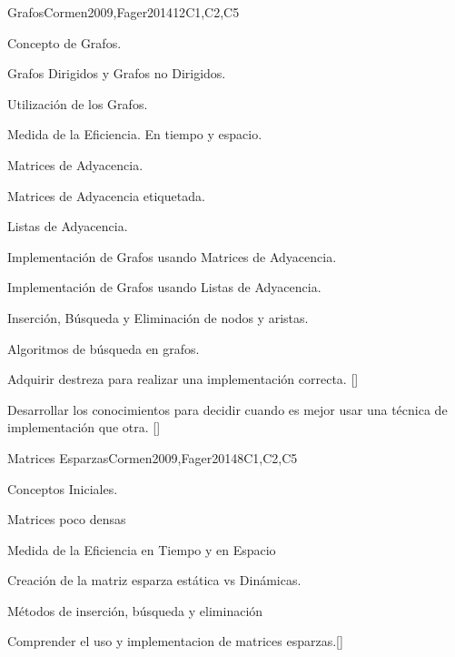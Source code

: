 \begin{syllabus}
\begin{unit}{}{Grafos}{Cormen2009,Fager2014}{12}{C1,C2,C5}
   \begin{topics}
    \item Concepto de Grafos.
    \item Grafos Dirigidos y Grafos no Dirigidos.
    \item Utilización de los Grafos.
    \item Medida de la Eficiencia. En tiempo y espacio.
    \item Matrices de Adyacencia.
    \item Matrices de Adyacencia etiquetada.
    \item Listas de Adyacencia.
    \item Implementación de Grafos usando Matrices de Adyacencia.
    \item Implementación de Grafos usando Listas de Adyacencia.
    \item Inserción, Búsqueda y Eliminación de nodos y aristas.
    \item Algoritmos de búsqueda en grafos.
   \end{topics}
   \begin{learningoutcomes}
      \item  Adquirir destreza para realizar una implementación correcta. [\Usage]
      \item  Desarrollar los conocimientos para decidir cuando es mejor usar una técnica de implementación que otra. [\Usage]   
   \end{learningoutcomes}
\end{unit}

\begin{unit}{}{Matrices Esparzas}{Cormen2009,Fager2014}{8}{C1,C2,C5}
   \begin{topics}
    \item  Conceptos  Iniciales.
    \item  Matrices poco densas
    \item  Medida de la Eficiencia en Tiempo  y en Espacio
    \item  Creación de la matriz esparza estática vs Dinámicas.
    \item  Métodos de inserción, búsqueda y eliminación
   \end{topics}

\begin{learningoutcomes}
      \item Comprender el uso y implementacion de matrices esparzas.[\Assessment]
   \end{learningoutcomes}
\end{unit}


\end{syllabus}
